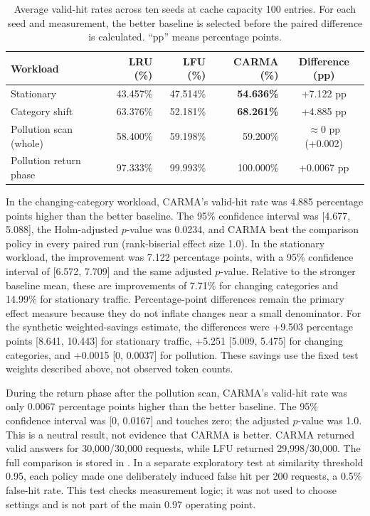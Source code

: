 \documentclass[10pt,letterpaper]{article}
\begin{document}
\begin{table}[ht]
\centering
\begin{tabular}{@{}lrrrc@{}}
\toprule
Workload & LRU (\%) & LFU (\%) & CARMA (\%) & Difference (pp) \\
\midrule
Stationary & 43.457\% & 47.514\% & \textbf{54.636\%} & +7.122 pp \\
Category shift & 63.376\% & 52.181\% & \textbf{68.261\%} & +4.885 pp \\
Pollution scan (whole) & 58.400\% & 59.198\% & 59.200\% & $\approx$0 pp (+0.002) \\
Pollution return phase & 97.333\% & 99.993\% & 100.000\% & +0.0067 pp \\
\bottomrule
\end{tabular}
\caption{Average valid-hit rates across ten seeds at cache capacity 100 entries.
For each seed
and measurement, the better baseline is selected before the paired difference
is calculated. ``pp'' means percentage points.}
\end{table}

In the changing-category workload, CARMA's valid-hit rate was 4.885 percentage
points higher than the better baseline. The 95\% confidence interval was
[4.677, 5.088], the Holm-adjusted $p$-value was 0.0234, and CARMA beat the
comparison policy in every paired run (rank-biserial effect size 1.0). In the
stationary workload, the improvement was 7.122 percentage points, with a 95\%
confidence interval of [6.572, 7.709] and the same adjusted $p$-value. Relative
to the stronger baseline mean, these are improvements of 7.71\% for changing
categories and 14.99\% for stationary traffic. Percentage-point differences
remain the primary effect measure because they do not inflate changes near a
small denominator. For the
synthetic weighted-savings estimate, the differences were +9.503 percentage
points [8.641, 10.443] for stationary traffic, +5.251 [5.009, 5.475] for
changing categories, and +0.0015 [0, 0.0037] for pollution. These savings use
the fixed test weights described above, not observed token counts.

During the return phase after the pollution scan, CARMA's valid-hit rate was
only 0.0067 percentage points higher than the better baseline. The 95\%
confidence interval was [0, 0.0167] and touches zero; the adjusted $p$-value
was 1.0. This is a neutral result, not evidence that CARMA is better. CARMA
returned valid answers for 30,000/30,000 requests, while LFU returned
29,998/30,000. The full comparison is stored in
. In a separate exploratory
test at similarity threshold 0.95, each policy made one deliberately induced
false hit per 200 requests, a 0.5\% false-hit rate. This test checks measurement
logic; it was not used to choose settings and is not part of the main 0.97
operating point.
\end{document}
